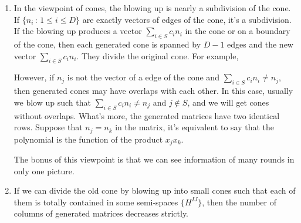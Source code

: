 \documentclass[12pt]{article}
\theoremstyle{definition}
\theoremstyle{plain}
\begin{document}
\begin{enumerate}
	\item In the viewpoint of cones, the blowing up is nearly a subdivision of the cone.
	If $\{n_i\,:\, 1\leq i\leq D\}$ are exactly vectors of edges of the cone, 
	it's a subdivision. 
	If the blowing up produces a vector $\sum_{i\in S} c_i n_i$ in the cone 
	or on a boundary of the cone, then each generated cone is spanned by $D-1$ edges 
	and the new vector $\sum_{i\in S} c_i n_i$. They divide the original cone. For example,
	\begin{center}
	\end{center}

	However, if $n_j$ is not the vector of a edge of the cone and $\sum_{i\in S} c_i n_i\neq n_j$,
	then generated cones may have overlaps with each other. In this case, usually we
	blow up such that $\sum_{i\in S} c_i n_i\neq n_j$ and $j\not\in S$, and we will get cones 
	without overlaps. What's more, the generated matrices have two identical rows. 
	Suppose that $n_j=n_k$ in the matrix, it's equivalent to say that the polynomial is the 
	function of the product $x_jx_k$.
	
	The bonus of this viewpoint is that we can see information of many rounds in only one picture.

	\item If we can divide the old cone by blowing up into small cones such that 
	each of them is totally contained in some semi-spaces $\{H^{IJ}\}$, then
	the number of columns of generated matrices decreases strictly.
	
\end{enumerate}
\end{document}
